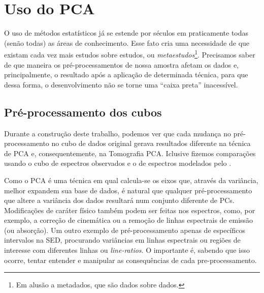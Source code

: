 



\chapter{Uso do PCA}
\label{sec:UsoPCA}

O uso de métodos estatísticos já se estende por séculos em praticamente todas
(senão todas) as áreas de conhecimento. Esse fato cria uma necessidade de que
existam cada vez mais estudos sobre estudos, ou {\em metaestudos}\footnote{Em
alusão a metadados, que são dados sobre dados.}. Precisamos saber de que maneira
os pré-processamentos de nossa amostra afetam os dados e, principalmente, o
resultado após a aplicação de determinada técnica, para que dessa
forma, o desenvolvimento não se torne uma ``caixa preta'' inacessível.

\section{Pré-processamento dos cubos}
\label{sec:UsoPCA:PCAlidades}

Durante a construção deste trabalho, podemos ver que cada mudança no
pré-processamento no cubo de dados original gerava resultados diferente na
técnica de PCA e, consequentemente, na Tomografia PCA. Iclusive fizemos
comparações usando o cubo de espectros observados e o de espectros modelados pelo \starlight
\citep{CidFernandes2013I}.

Como o PCA é uma técnica em qual calcula-se os eixos que, através da variância,
melhor expandem sua base de dados, é natural que qualquer pré-processamento que
altere a variância dos dados resultará num conjunto diferente de PCs.
Modificações de caráter físico também podem ser feitas nos espectros, como, por
exemplo, a correção de cinemática ou a remoção de linhas espectrais de emissão
(ou absorção). Um outro exemplo de pré-processamento apenas de específicos
intervalos na SED, procurando variâncias em linhas espectrais ou regiões de
interesse com diferentes linhas ou {\em line-ratios}. O importante é,
sabendo que isso ocorre, tentar entender e manipular as consequências de cada
pre-processamento.

